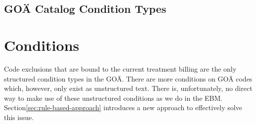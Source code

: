 \subsection{GOÄ Catalog Condition Types}\label{subsec:goa-condition-types}


\section{Conditions}\label{sec:goae-conditions}
Code exclusions that are bound to the current treatment billing are the only structured condition types in the GOÄ.
There are more conditions on GOÄ codes which, however, only exist as unstructured text.
There is, unfortunately, no direct way to make use of these unstructured conditions as we do in the EBM.
Section\ref{sec:rule-based-approach} introduces a new approach to effectively solve this issue.
